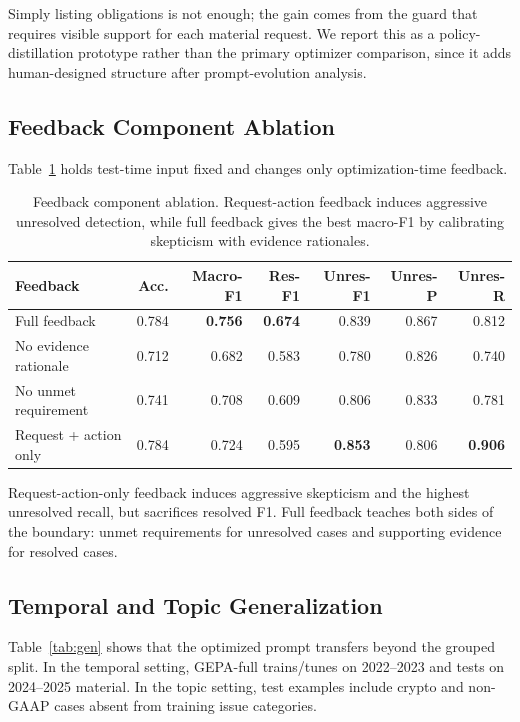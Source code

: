 \documentclass[11pt]{article}
\begin{document}
Simply listing obligations is not enough; the gain comes from the guard that requires visible support for each material request. We report this as a policy-distillation prototype rather than the primary optimizer comparison, since it adds human-designed structure after prompt-evolution analysis.

\subsection{Feedback Component Ablation}

Table~\ref{tab:feedback} holds test-time input fixed and changes only optimization-time feedback.

\begin{table}[t]
\centering
\small
\begin{tabular}{lrrrrrr}
\toprule
\textbf{Feedback} & \textbf{Acc.} & \textbf{Macro-F1} & \textbf{Res-F1} & \textbf{Unres-F1} & \textbf{Unres-P} & \textbf{Unres-R} \\
\midrule
Full feedback & 0.784 & \textbf{0.756} & \textbf{0.674} & 0.839 & 0.867 & 0.812 \\
No evidence rationale & 0.712 & 0.682 & 0.583 & 0.780 & 0.826 & 0.740 \\
No unmet requirement & 0.741 & 0.708 & 0.609 & 0.806 & 0.833 & 0.781 \\
Request + action only & 0.784 & 0.724 & 0.595 & \textbf{0.853} & 0.806 & \textbf{0.906} \\
\bottomrule
\end{tabular}
\caption{Feedback component ablation. Request-action feedback induces aggressive unresolved detection, while full feedback gives the best macro-F1 by calibrating skepticism with evidence rationales.}
\label{tab:feedback}
\end{table}

Request-action-only feedback induces aggressive skepticism and the highest unresolved recall, but sacrifices resolved F1. Full feedback teaches both sides of the boundary: unmet requirements for unresolved cases and supporting evidence for resolved cases.

\subsection{Temporal and Topic Generalization}

Table~\ref{tab:gen} shows that the optimized prompt transfers beyond the grouped split. In the temporal setting, GEPA-full trains/tunes on 2022--2023 and tests on 2024--2025 material. In the topic setting, test examples include crypto and non-GAAP cases absent from training issue categories.
\end{document}

